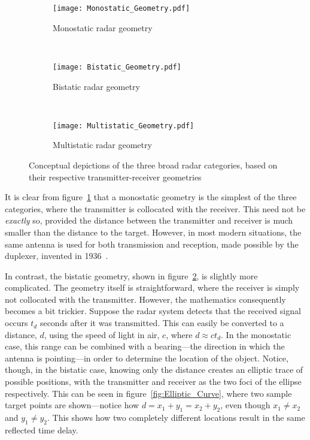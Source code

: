 \documentclass[class=report,11pt,crop=false]{standalone}
\begin{document}
\begin{figure}[htbp]
    \centering
    \begin{subfigure}[t]{0.48\textwidth}
        \centering
        \texttt{[image: Monostatic\_Geometry.pdf]}
        \caption{Monostatic radar geometry}
        \label{fig:Monostatic_Geometry}
    \end{subfigure}%
    ~ 
    \begin{subfigure}[t]{0.48\textwidth}
        \centering
        \texttt{[image: Bistatic\_Geometry.pdf]}
        \caption{Bistatic radar geometry}
        \label{fig:Bistatic_Geometry}
    \end{subfigure}
    ~
    \begin{subfigure}[t]{0.6\textwidth}
        \centering
        \texttt{[image: Multistatic\_Geometry.pdf]}
        \caption{Multistatic radar geometry}
        \label{fig:Multistatic_Geometry}
    \end{subfigure}%
    \caption{Conceptual depictions of the three broad radar categories, based on their respective transmitter-receiver geometries}
    \label{fig:Radar_Geometry_Depictions}
\end{figure}

It is clear from figure~\ref{fig:Monostatic_Geometry} that a monostatic geometry is the simplest of the three categories, where the transmitter is collocated with the receiver. This need not be \emph{exactly} so, provided the distance between the transmitter and receiver is much smaller than the distance to the target. However, in most modern situations, the same antenna is used for both transmission and reception, made possible by the duplexer, invented in 1936~\cite{kuschel-hagan-history}.

In contrast, the bistatic geometry, shown in figure~\ref{fig:Bistatic_Geometry}, is slightly more complicated. The geometry itself is straightforward, where the receiver is simply not collocated with the transmitter. However, the mathematics consequently becomes a bit trickier. Suppose the radar system detects that the received signal occurs \(t_d\) seconds after it was transmitted. This can easily be converted to a distance, \(d\), using the speed of light in air, \(c\), where \(d \approx ct_d\). In the monostatic case, this range can be combined with a bearing---the direction in which the antenna is pointing---in order to determine the location of the object. Notice, though, in the bistatic case, knowing only the distance creates an elliptic trace of possible positions, with the transmitter and receiver as the two foci of the ellipse respectively. This can be seen in figure~\ref{fig:Elliptic_Curve}, where two sample target points are shown---notice how \(d = x_1 + y_1 = x_2 + y_2\), even though \(x_1 \ne x_2\) and \(y_1 \ne y_2\). This shows how two completely different locations result in the same reflected time delay.
\end{document}
